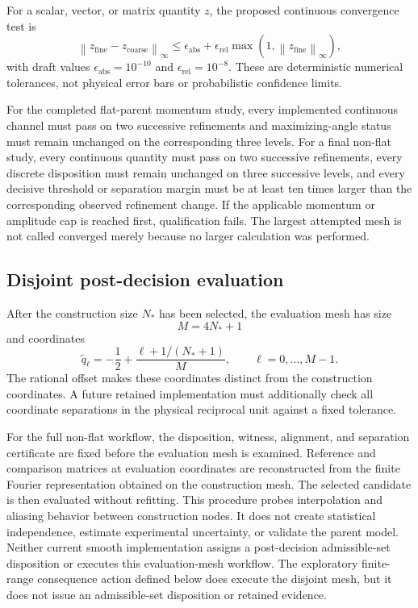 \documentclass[11pt]{article}
\newcommand{\norm}[1]{\left\lVert #1\right\rVert}
\begin{document}
For a scalar, vector, or matrix quantity $z$, the proposed continuous convergence test is
\begin{equation}
 \norm{z_{\mathrm{fine}}-z_{\mathrm{coarse}}}_\infty
 \le
 \epsilon_{\mathrm{abs}}
 +\epsilon_{\mathrm{rel}}
  \max\!\left(1,\norm{z_{\mathrm{fine}}}_\infty\right),
 \label{eq:convergence-test}
\end{equation}
with draft values
$\epsilon_{\mathrm{abs}}=10^{-10}$ and
$\epsilon_{\mathrm{rel}}=10^{-8}$. These are deterministic numerical tolerances, not
physical error bars or probabilistic confidence limits.

For the completed flat-parent momentum study, every implemented continuous channel must
pass on two successive refinements and maximizing-angle status must remain unchanged on
the corresponding three levels. For a final non-flat study, every continuous
quantity must pass on two successive refinements, every discrete disposition must remain
unchanged on three successive levels, and every decisive threshold or separation margin
must be at least ten times larger than the corresponding observed refinement change. If
the applicable momentum or amplitude cap is reached first, qualification fails. The
largest attempted mesh is not called converged merely because no larger calculation was
performed.

\subsection{Disjoint post-decision evaluation}

After the construction size $N_*$ has been selected, the evaluation mesh has size
\begin{equation}
 M=4N_*+1
 \label{eq:evaluation-size}
\end{equation}
and coordinates
\begin{equation}
 \widetilde q_\ell=-\frac12+
 \frac{\ell+1/(N_*+1)}{M},
 \qquad \ell=0,\ldots,M-1.
 \label{eq:evaluation-mesh}
\end{equation}
The rational offset makes these coordinates distinct from the construction coordinates.
A future retained implementation must additionally check all coordinate separations in
the physical reciprocal unit against a fixed tolerance.

For the full non-flat workflow, the disposition, witness, alignment, and
separation certificate are fixed before the evaluation mesh is examined. Reference and
comparison matrices at evaluation coordinates are reconstructed from the finite Fourier
representation obtained on the construction mesh. The selected candidate is then
evaluated without refitting. This procedure probes interpolation and aliasing behavior
between construction nodes. It does not create statistical independence, estimate
experimental uncertainty, or validate the parent model. Neither current smooth implementation assigns a post-decision admissible-set disposition
or executes this evaluation-mesh workflow. The exploratory finite-range consequence
action defined below does execute the disjoint mesh, but it does not issue an
admissible-set disposition or retained evidence.
\end{document}
